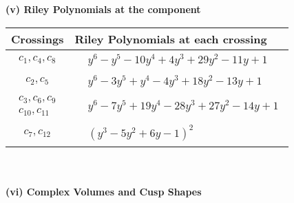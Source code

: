 \documentclass[1p]{elsarticle_modified}
\theoremstyle{definition}
\begin{document}
\newpage\renewcommand{\arraystretch}{1}
\flushleft \textbf{(v) Riley Polynomials at the component}\newline \\
\begin{tabular}{m{50pt}|m{274pt}}
Crossings & \hspace{64pt}Riley Polynomials at each crossing \\
\hline $$\begin{aligned}c_{1},c_{4},c_{8}\end{aligned}$$&$\begin{aligned}
&y^6- y^5-10 y^4+4 y^3+29 y^2-11 y+1
\end{aligned}$\\
\hline $$\begin{aligned}c_{2},c_{5}\end{aligned}$$&$\begin{aligned}
&y^6-3 y^5+y^4-4 y^3+18 y^2-13 y+1
\end{aligned}$\\
\hline $$\begin{aligned}c_{3},c_{6},c_{9}\\c_{10},c_{11}\end{aligned}$$&$\begin{aligned}
&y^6-7 y^5+19 y^4-28 y^3+27 y^2-14 y+1
\end{aligned}$\\
\hline $$\begin{aligned}c_{7},c_{12}\end{aligned}$$&$\begin{aligned}
&(y^3-5 y^2+6 y-1)^2
\end{aligned}$\\
\hline
\end{tabular}\\~\\
\newpage\flushleft \textbf{(vi) Complex Volumes and Cusp Shapes}
\end{document}
